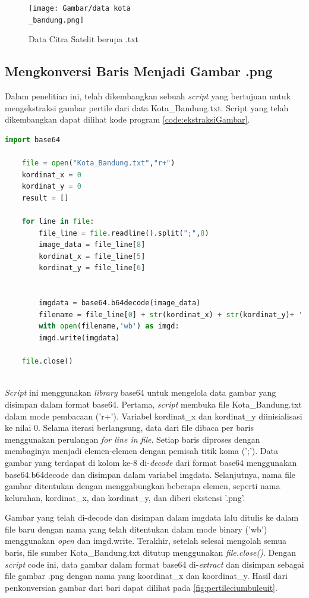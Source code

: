 \begin{figure}[H]
	\centering
	\texttt{[image: Gambar/data kota\\\_bandung.png]}
	\caption{Data Citra Satelit berupa .txt}
	\label{fig:kotabandungteks}
\end{figure} 

\subsection{Mengkonversi Baris Menjadi Gambar .png}
\label{subsec:pengkorvesianBaris}
Dalam penelitian ini, telah dikembangkan sebuah \textit{script} yang bertujuan untuk mengekstraksi gambar pertile dari data Kota\_Bandung.txt. Script yang telah dikembangkan dapat dilihat kode program \ref{code:ekstraksiGambar}.

\begin{lstlisting}[language=Python, caption=Script Mengekstrasi gambar per tile,label={code:ekstraksiGambar}]
	import base64
	
	file = open("Kota_Bandung.txt","r+")
	kordinat_x = 0
	kordinat_y = 0
	result = []
	
	for line in file:
		file_line = file.readline().split(";",8)   
		image_data = file_line[8]
		kordinat_x = file_line[5]
		kordinat_y = file_line[6]
		
		
		imgdata = base64.b64decode(image_data)
		filename = file_line[0] + str(kordinat_x) + str(kordinat_y)+ '.png'
		with open(filename,'wb') as imgd:
		imgd.write(imgdata)
	
	file.close()
		
\end{lstlisting}

\textit{Script }ini menggunakan \textit{library} base64 untuk mengelola data gambar yang disimpan dalam format base64. Pertama, \textit{script} membuka file Kota\_Bandung.txt dalam mode pembacaan ('r+'). Variabel kordinat\_x dan kordinat\_y diinisialisasi ke nilai 0. Selama iterasi berlangsung, data dari file dibaca per baris menggunakan perulangan \textit{for line in file}. Setiap baris diproses dengan membaginya menjadi elemen-elemen dengan pemisah titik koma (';'). Data gambar yang terdapat di kolom ke-8 di-\textit{decode} dari format base64 menggunakan base64.b64decode dan disimpan dalam variabel imgdata. Selanjutnya, nama file gambar ditentukan dengan menggabungkan beberapa elemen, seperti nama kelurahan, kordinat\_x, dan kordinat\_y, dan diberi ekstensi '.png'.

Gambar yang telah di-decode dan disimpan dalam imgdata lalu ditulis ke dalam file baru dengan nama yang telah ditentukan dalam mode binary ('wb') menggunakan \textit{open} dan imgd.write. Terakhir, setelah selesai mengolah semua baris, file sumber Kota\_Bandung.txt ditutup menggunakan \textit{file.close()}. Dengan \textit{script} code ini, data gambar dalam format base64 di-\textit{extract} dan disimpan sebagai file gambar .png dengan nama yang koordinat\_x dan koordinat\_y. Hasil dari penkonversian gambar dari bari dapat dilihat pada \ref{fig:pertileciumbuleuit}.

